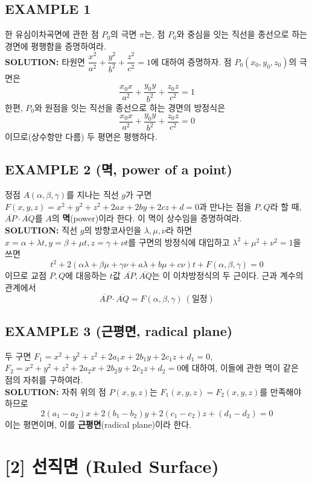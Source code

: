 \documentclass{article}
\theoremstyle{mystyle}
\begin{document}
\subsection*{EXAMPLE 1}
한 유심이차곡면에 관한 점 \(P_0\)의 극면 \(\pi\)는, 점 \(P_0\)와 중심을 잇는 직선을 종선으로 하는 경면에 평행함을 증명하여라.\\
\textbf{SOLUTION:} 타원면 \(\dfrac{x^2}{a^2}+\dfrac{y^2}{b^2}+\dfrac{z^2}{c^2}=1\)에 대하여 증명하자. 점 \(P_0(x_0,y_0,z_0)\)의 극면은
\[
\frac{x_0x}{a^2}+\frac{y_0y}{b^2}+\frac{z_0z}{c^2}=1
\]
한편, \(P_0\)와 원점을 잇는 직선을 종선으로 하는 경면의 방정식은
\[
\frac{x_0x}{a^2}+\frac{y_0y}{b^2}+\frac{z_0z}{c^2}=0
\]
이므로(상수항만 다름) 두 평면은 평행하다.

\subsection*{EXAMPLE 2 (멱, power of a point)}
정점 \(A(\alpha,\beta,\gamma)\)를 지나는 직선 \(g\)가 구면 \(F(x,y,z)=x^2+y^2+z^2+2ax+2by+2cz+d=0\)과 만나는 점을 \(P,Q\)라 할 때, \(\overline{AP}\cdot\overline{AQ}\)를 \(A\)의 \textbf{멱}(power)이라 한다. 이 멱이 상수임을 증명하여라.\\
\textbf{SOLUTION:} 직선 \(g\)의 방향코사인을 \(\lambda,\mu,\nu\)라 하면 \(x=\alpha+\lambda t,y=\beta+\mu t,z=\gamma+\nu t\)를 구면의 방정식에 대입하고 \(\lambda^2+\mu^2+\nu^2=1\)을 쓰면
\[
t^2+2(\alpha\lambda+\beta\mu+\gamma\nu+a\lambda+b\mu+c\nu)t+F(\alpha,\beta,\gamma)=0
\]
이므로 교점 \(P,Q\)에 대응하는 \(t\)값 \(\overline{AP},\overline{AQ}\)는 이 이차방정식의 두 근이다. 근과 계수의 관계에서
\[
\overline{AP}\cdot\overline{AQ}=F(\alpha,\beta,\gamma)\ (\text{일정})
\]

\subsection*{EXAMPLE 3 (근평면, radical plane)}
두 구면 \(F_1=x^2+y^2+z^2+2a_1x+2b_1y+2c_1z+d_1=0\), \(F_2=x^2+y^2+z^2+2a_2x+2b_2y+2c_2z+d_2=0\)에 대하여, 이들에 관한 멱이 같은 점의 자취를 구하여라.\\
\textbf{SOLUTION:} 자취 위의 점 \(P(x,y,z)\)는 \(F_1(x,y,z)=F_2(x,y,z)\)를 만족해야 하므로
\[
2(a_1-a_2)x+2(b_1-b_2)y+2(c_1-c_2)z+(d_1-d_2)=0
\]
이는 평면이며, 이를 \textbf{근평면}(radical plane)이라 한다.

\section*{[2] 선직면 (Ruled Surface)}
\end{document}
